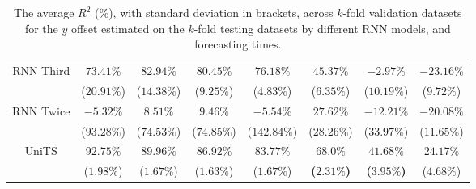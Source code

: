 \begin{table}[!ht]
{\begin{tabular}{|c|c|c|c|c|c|c|c|}
			\multirow{2}{*}{RNN Third} & $73.41\%$ & $82.94\%$ & $80.45\%$ & $76.18\%$ & $45.37\%$ & $-2.97\%$ & $-23.16\%$ \\
			 & ($20.91\%$) & ($14.38\%$) & ($9.25\%$) & ($4.83\%$) & ($6.35\%$) & ($10.19\%$) & ($9.72\%$) \\ \hline
			\multirow{2}{*}{RNN Twice} & $-5.32\%$ & $8.51\%$ & $9.46\%$ & $-5.54\%$ & $27.62\%$ & $-12.21\%$ & $-20.08\%$ \\
			 & ($93.28\%$) & ($74.53\%$) & ($74.85\%$) & ($142.84\%$) & ($28.26\%$) & ($33.97\%$) & ($11.65\%$) \\ \hline
			\multirow{2}{*}{UniTS} & $92.75\%$ & $89.96\%$ & $86.92\%$ & $83.77\%$ & $\mathbf{68.0\%}$ & $\mathbf{41.68\%}$ & $24.17\%$ \\
			 & ($1.98\%$) & ($1.67\%$) & ($1.63\%$) & ($1.67\%$) & \textbf{(}$\mathbf{2.31\%}$\textbf{)} & \textbf{(}$\mathbf{3.95\%}$\textbf{)} & ($4.68\%$) \\ \hline
		\end{tabular}
	}
	\caption{The average $R^{2}$ (\%), with standard deviation in brackets, across $k$-fold validation datasets for the $y$ offset estimated on the $k$-fold testing datasets by different RNN models, and forecasting times.}
	\label{tab:all_latitude_no_abs_R2}
\end{table}

